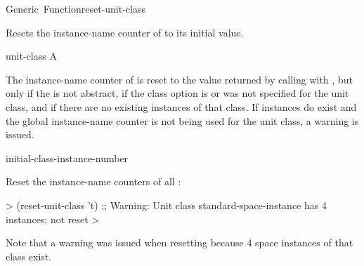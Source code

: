 \documentclass[10pt,twoside,english,pdftex]{article}
\begin{document}

\begin{functiondoc}{Generic~Function}{reset-unit-class}%
  {}

\fnsyntax

\fnpurpose Resets the  instance-name counter of
 to its initial value.

\fnmethods
{}%
  {\code{(} }
%
  {\code{(} }
%
  {\code{(} }

\fnpackage {}

\fnmodule {}

\fnargs
\begin{args}{unit-class}
 A 
\end{args}

%
%
\fndescription
%
The  instance-name counter of  is reset to
the value returned by calling
 with ,
but only if the  is not abstract, if the
 class option is \nil{} or was
not specified for the unit class, and if there are no existing instances of
that class.  If instances do exist and the global instance-name counter is not
being used for the unit class, a warning is issued.

\begin{alsos}{initial-class-instance-number}
\end{alsos}

\fnexample Reset the instance-name counters of all :
%
\W\supp
\begin{example}
  > (reset-unit-class 't)
  ;; Warning: Unit class standard-space-instance has 4 instances; not reset
  >
\end{example}
%
Note that a warning was issued when resetting
 because 4 space
instances of that class exist.

\end{functiondoc}
\end{document}
